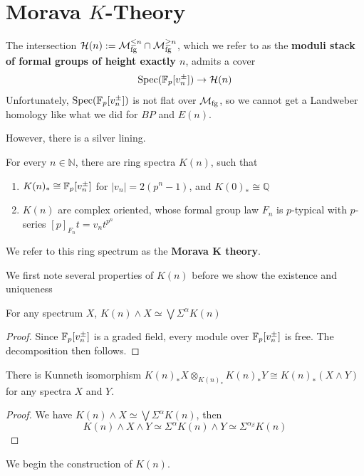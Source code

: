 \section{Morava $K$-Theory}\label{sec:chromatic-more-moravaktheory}
The intersection $\mathcal{H}(n):=\mathcal{M}_{\mathrm{fg}}^{\leq n}\cap \mathcal{M}_{\mathrm{fg}}^{\geq n}$, which we refer to as the \textbf{moduli stack of formal groups of height exactly $n$}, admits a cover
\[
\operatorname{\mathrm{Spec}}(\mathbb{F}_p[v_n^{\pm}])\to \mathcal{H}(n)
\]
Unfortunately, $\operatorname{\mathrm{Spec}}(\mathbb{F}_p[v_n^{\pm}])$ is not flat over $\mathcal{M}_{\mathrm{fg}}$, so we cannot get a Landweber homology like what we did for $BP$ and $E(n)$. 

However, there is a silver lining.
\begin{theorem}
    For every $n\in \mathbb{N}$, there are ring spectra $K(n)$, such that 
    \begin{enumerate}
        \item $K(n)_*\cong \mathbb{F}_p[v_n^{\pm}]$ for $|v_n|=2(p^n-1)$, and $K(0)_*\cong \mathbb{Q}$
        \item $K(n)$ are complex oriented, whose formal group law $F_n$ is $p$-typical with $p$-series $[p]_{F_n}t=v_nt^{p^n}$
    \end{enumerate}
\end{theorem}

We refer to this ring spectrum as the \textbf{Morava K theory}.

We first note several properties of $K(n)$ before we show the existence and uniqueness

\begin{lemma}
    For any spectrum $X$, $K(n)\wedge X\simeq \bigvee \Sigma^{\alpha }K(n)$ 
\end{lemma}
\begin{proof}
    Since $\mathbb{F}_p[v_n^{\pm}]$ is a graded field, every module over $\mathbb{F}_p[v_n^{\pm}]$ is free. The decomposition then follows.
\end{proof}

\begin{lemma}
      There is Kunneth isomorphism $K(n)_*X\otimes_{K(n)_*}K(n)_*Y\cong K(n)_*(X\wedge Y)$ for any spectra $X$ and $Y$.
\end{lemma}
\begin{proof}
    We have $K(n)\wedge X\simeq \bigvee \Sigma^{\alpha }K(n)$, then 
    \[
    K(n)\wedge X\wedge Y\simeq \Sigma^{\alpha }K(n)\wedge Y\simeq \Sigma^{\alpha_\beta }K(n)
    \]
\end{proof}

We begin the construction of $K(n)$. 

